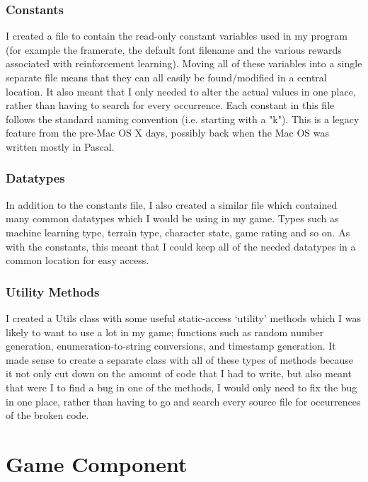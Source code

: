 \documentclass[a4paper,oneside]{report}
\begin{document}
\subsection{Constants} 

I created a file to contain the read-only constant variables used in my program (for example the framerate, the default font filename and the various rewards associated with reinforcement learning). Moving all of these variables into a single separate file means that they can all easily be found/modified in a central location. It also meant that I only needed to alter the actual values in one place, rather than having to search for every occurrence. Each constant in this file follows the standard naming convention (i.e. starting with a "k"). This is a legacy feature from the pre-Mac OS X days, possibly back when the Mac OS was written mostly in Pascal. 

\subsection{Datatypes} 

In addition to the constants file, I also created a similar file which contained many common datatypes which I would be using in my game. Types such as machine learning type, terrain type, character state, game rating and so on. As with the constants, this meant that I could keep all of the needed datatypes in a common location for easy access.

\subsection{Utility Methods} 

I created a Utils class with some useful static-access `utility' methods which I was likely to want to use a lot in my game; functions such as random number generation, enumeration-to-string conversions, and timestamp generation. It made sense to create a separate class with all of these types of methods because it not only cut down on the amount of code that I had to write, but also meant that were I to find a bug in one of the methods, I would only need to fix the bug in one place, rather than having to go and search every source file for occurrences of the broken code. 

\chapter{Game Component}
		
\end{document}
